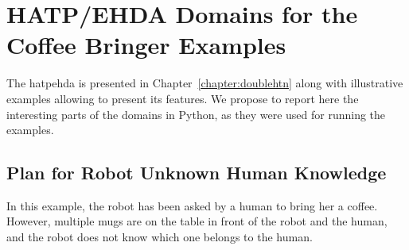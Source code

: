 \chapter{HATP/EHDA Domains for the Coffee Bringer Examples}
\label{annex:codedomains}

The \acrfull{hatpehda} is presented in Chapter~\ref{chapter:doublehtn} along with illustrative examples allowing to present its features. We propose to report here the interesting parts of the domains in Python, as they were used for running the examples.

\section{Plan for Robot Unknown Human Knowledge}
\label{annex:domainmugs}
In this example, the robot has been asked by a human to bring her a coffee. However, multiple mugs are on the table in front of the robot and the human, and the robot does not know which one belongs to the human.

